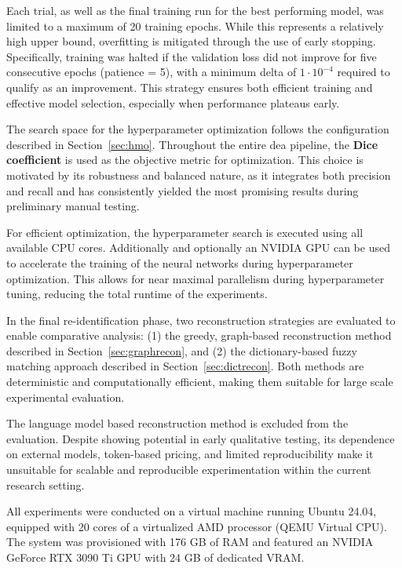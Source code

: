 Each trial, as well as the final training run for the best performing model, was limited to a maximum of 20 training epochs.
While this represents a relatively high upper bound, overfitting is mitigated through the use of early stopping.
Specifically, training was halted if the validation loss did not improve for five consecutive epochs (patience = 5), with a minimum delta of $1 \cdot 10^{-4}$ required to qualify as an improvement.
This strategy ensures both efficient training and effective model selection, especially when performance plateaus early.

The search space for the hyperparameter optimization follows the configuration described in Section~\ref{sec:hmo}.
Throughout the entire \ac{dea} pipeline, the \textbf{Dice coefficient} is used as the objective metric for optimization.
This choice is motivated by its robustness and balanced nature, as it integrates both precision and recall and has consistently yielded the most promising results during preliminary manual testing.

For efficient optimization, the hyperparameter search is executed using all available CPU cores.
Additionally and optionally an NVIDIA GPU can be used to accelerate the training of the neural networks during hyperparameter optimization.
This allows for near maximal parallelism during hyperparameter tuning, reducing the total runtime of the experiments.

In the final re-identification phase, two reconstruction strategies are evaluated to enable comparative analysis: (1) the greedy, graph-based reconstruction method described in Section~\ref{sec:graphrecon}, and (2) the dictionary-based fuzzy matching approach described in Section~\ref{sec:dictrecon}.
Both methods are deterministic and computationally efficient, making them suitable for large scale experimental evaluation.

The language model based reconstruction method is excluded from the evaluation.
Despite showing potential in early qualitative testing, its dependence on external models, token-based pricing, and limited reproducibility make it unsuitable for scalable and reproducible experimentation within the current research setting.

All experiments were conducted on a virtual machine running Ubuntu 24.04, equipped with 20 cores of a virtualized AMD processor (QEMU Virtual CPU).
The system was provisioned with 176 GB of RAM and featured an NVIDIA GeForce RTX 3090 Ti GPU with 24 GB of dedicated VRAM.

